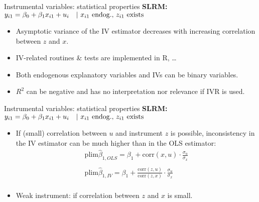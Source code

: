 \documentclass[usenames,dvipsnames]{beamer}
\begin{document}
\begin{frame}{Instrumental variables: statistical properties}
\textbf{SLRM:} $y_{i1} = \beta_0 + \beta_1 x_{i1} + u_i \quad |~x_{i1} \textnormal{~endog.,~} z_{i1} \textnormal{~exists}$
\bigskip
\begin{itemize}
\item Asymptotic variance of the IV estimator decreases with increasing correlation between $z$ and $x$. 
\medskip
\item IV-related routines \& tests are implemented in R, \dots 
\medskip
\item Both endogenous explanatory variables and IVs can be binary variables.
\medskip
\item $R^2$ can be negative and has no interpretation nor relevance if IVR is used.
\end{itemize}
\end{frame}
\begin{frame}{Instrumental variables: statistical properties}
\textbf{SLRM:} $y_{i1} = \beta_0 + \beta_1 x_{i1} + u_i \quad |~x_{i1} \textnormal{~endog.,~} z_{i1} \textnormal{~exists}$
\medskip
\begin{itemize}
\item If (small) correlation between $u$ and instrument $z$ is possible, inconsistency in the IV estimator can be much higher than in the OLS estimator:
\vspace{0.3cm}
\begin{align*}
\mathrm{plim}\hat{\beta}_{1, OLS} = \beta_1 + \mathrm{corr}(x, u) \cdot \frac{\sigma_u}{\sigma_x} \\
~\\
\mathrm{plim}\hat{\beta}_{1, IV} = \beta_1 + \frac{\mathrm{corr}(z, u)}{\mathrm{corr}(z, x)} \cdot \frac{\sigma_u}{\sigma_x} \\
\end{align*}
\item Weak instrument: if correlation between  $z$ and $x$ is small.
\end{itemize}
\end{frame}
\end{document}
